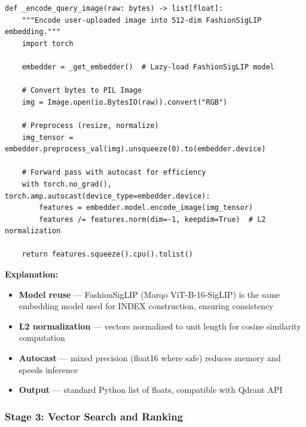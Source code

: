 \documentclass[12pt, twoside]{report}
\begin{document}
\begin{lstlisting}[caption={Query Image Encoding --- search/image\_query\_engine.py}]
def _encode_query_image(raw: bytes) -> list[float]:
    """Encode user-uploaded image into 512-dim FashionSigLIP embedding."""
    import torch
    
    embedder = _get_embedder()  # Lazy-load FashionSigLIP model
    
    # Convert bytes to PIL Image
    img = Image.open(io.BytesIO(raw)).convert("RGB")
    
    # Preprocess (resize, normalize)
    img_tensor = embedder.preprocess_val(img).unsqueeze(0).to(embedder.device)
    
    # Forward pass with autocast for efficiency
    with torch.no_grad(), torch.amp.autocast(device_type=embedder.device):
        features = embedder.model.encode_image(img_tensor)
        features /= features.norm(dim=-1, keepdim=True)  # L2 normalization
    
    return features.squeeze().cpu().tolist()
\end{lstlisting}

\textbf{Explanation:}
\begin{itemize}
    \item \textbf{Model reuse} --- FashionSigLIP (Marqo ViT-B-16-SigLIP) is the same embedding model used for INDEX construction, ensuring consistency
    \item \textbf{L2 normalization} --- vectors normalized to unit length for cosine similarity computation
    \item \textbf{Autocast} --- mixed precision (float16 where safe) reduces memory and speeds inference
    \item \textbf{Output} --- standard Python list of floats, compatible with Qdrant API
\end{itemize}

\subsubsection{Stage 3: Vector Search and Ranking}
\end{document}
